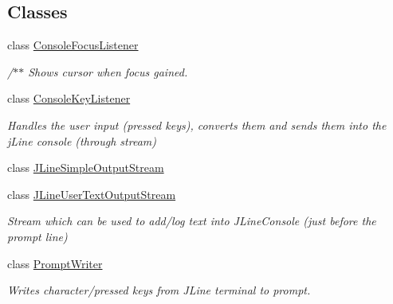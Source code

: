 \subsection*{Classes}
\begin{DoxyCompactItemize}
\item 
class \hyperlink{classgov_1_1nasa_1_1jpf_1_1inspector_1_1frontends_1_1jpfshell_1_1gui_1_1_swing_terminal_1_1_console_focus_listener}{Console\+Focus\+Listener}
\begin{DoxyCompactList}\small\item\em /$\ast$$\ast$ Shows cursor when focus gained. \end{DoxyCompactList}\item 
class \hyperlink{classgov_1_1nasa_1_1jpf_1_1inspector_1_1frontends_1_1jpfshell_1_1gui_1_1_swing_terminal_1_1_console_key_listener}{Console\+Key\+Listener}
\begin{DoxyCompactList}\small\item\em Handles the user input (pressed keys), converts them and sends them into the j\+Line console (through stream) \end{DoxyCompactList}\item 
class \hyperlink{classgov_1_1nasa_1_1jpf_1_1inspector_1_1frontends_1_1jpfshell_1_1gui_1_1_swing_terminal_1_1_j_line_simple_output_stream}{J\+Line\+Simple\+Output\+Stream}
\item 
class \hyperlink{classgov_1_1nasa_1_1jpf_1_1inspector_1_1frontends_1_1jpfshell_1_1gui_1_1_swing_terminal_1_1_j_line_user_text_output_stream}{J\+Line\+User\+Text\+Output\+Stream}
\begin{DoxyCompactList}\small\item\em Stream which can be used to add/log text into J\+Line\+Console (just before the prompt line) \end{DoxyCompactList}\item 
class \hyperlink{classgov_1_1nasa_1_1jpf_1_1inspector_1_1frontends_1_1jpfshell_1_1gui_1_1_swing_terminal_1_1_prompt_writer}{Prompt\+Writer}
\begin{DoxyCompactList}\small\item\em Writes character/pressed keys from J\+Line terminal to prompt. \end{DoxyCompactList}\end{DoxyCompactItemize}
